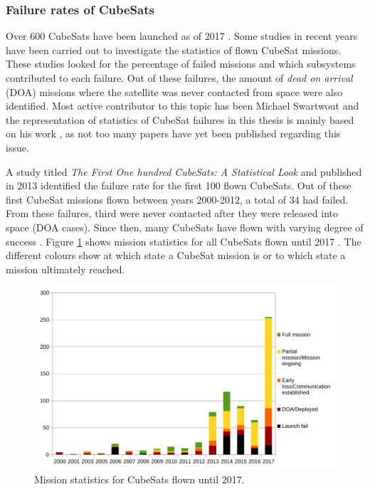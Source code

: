 \documentclass[english,12pt,a4paper,pdftex,elec,utf8]{aaltothesis}
\begin{document}
\subsubsection{Failure rates of CubeSats}
Over 600 CubeSats have been launched as of 2017 \cite{Swart2017kalvo}. Some studies in recent years have been carried out to investigate the statistics of flown CubeSat missions. These studies looked for the percentage of failed missions and which subsystems contributed to each failure. Out of these failures, the amount of \textit{dead on arrival} (DOA) missions where the satellite was never contacted from space were also identified. Most active contributor to this topic has been Michael Swartwout and the representation of statistics of CubeSat failures in this thesis is mainly based on his work \cite{Swart2016, Swart1, Swart2015}, as not too many papers have yet been published regarding this issue.\par 
A study titled \textit{The First One hundred CubeSats: A Statistical Look} and published in 2013 identified the failure rate for the first 100 flown CubeSats. Out of these first CubeSat missions flown between years 2000-2012, a total of 34 had failed. From these failures, third were never contacted after they were released into space (DOA cases). Since then, many CubeSats have flown with varying degree of success \cite{Swart2016}. Figure \ref{100first} shows mission statistics for all CubeSats flown until 2017 \cite{csdatabase}. The different colours show at which state a CubeSat mission is or to which state a mission ultimately reached. \par
\begin{figure}[h!]
\centering
\includegraphics[scale=0.6]{cfdnew}
\caption{Mission statistics for CubeSats flown until 2017. \cite{csdatabase}}
\label{100first}
\end{figure} 
\end{document}
